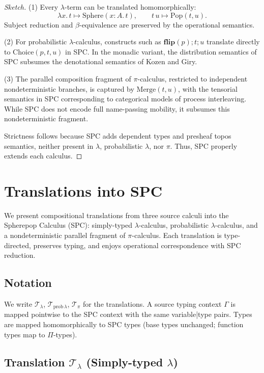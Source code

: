\documentclass{article}
\begin{document}
\begin{proof}[Sketch]
(1) Every $\lambda$-term can be translated homomorphically:
\[
\lambda x.\,t \mapsto \mathrm{Sphere}(x{:}A.\,t),
\qquad
t\,u \mapsto \mathrm{Pop}(t,u).
\]
Subject reduction and $\beta$-equivalence are preserved by the operational semantics.

(2) For probabilistic $\lambda$-calculus, constructs such as
$\mathbf{flip}(p); t; u$ translate directly to
$\mathrm{Choice}(p,t,u)$ in SPC. In the monadic variant, the distribution
semantics of SPC subsumes the denotational semantics of Kozen and Giry.

(3) The parallel composition fragment of $\pi$-calculus, restricted to
independent nondeterministic branches, is captured by $\mathrm{Merge}(t,u)$,
with the tensorial semantics in SPC corresponding to categorical models of
process interleaving. While SPC does not encode full name-passing mobility, it
subsumes this nondeterministic fragment.

Strictness follows because SPC adds dependent types and presheaf topos
semantics, neither present in $\lambda$, probabilistic $\lambda$, nor $\pi$.
Thus, SPC properly extends each calculus.
\end{proof}

\section{Translations into SPC}\label{sec:translations}

We present compositional translations from three source calculi into the
Spherepop Calculus (SPC): simply-typed $\lambda$-calculus, probabilistic
$\lambda$-calculus, and a nondeterministic parallel fragment of $\pi$-calculus.
Each translation is type-directed, preserves typing, and enjoys operational
correspondence with SPC reduction.

\subsection{Notation}

We write $\mathcal{T}_\lambda$, $\mathcal{T}_{\mathrm{prob}\,\lambda}$,
$\mathcal{T}_\pi$ for the translations. A source typing context $\Gamma$ is
mapped pointwise to the SPC context with the same variable|type pairs.
Types are mapped homomorphically to SPC types (base types unchanged; function
types map to $\Pi$-types).

\subsection{Translation $\mathcal{T}_\lambda$ (Simply-typed $\lambda$)}
\end{document}
